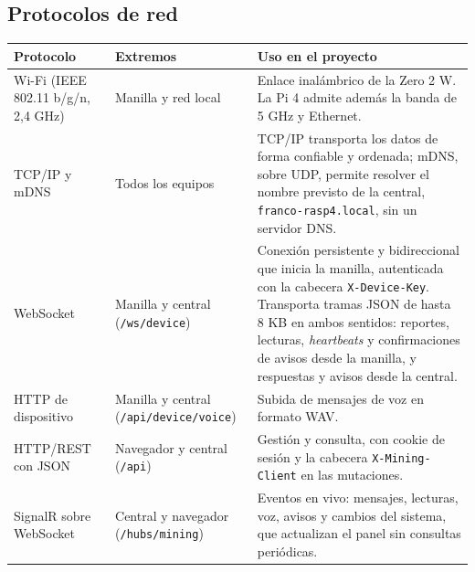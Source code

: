 \documentclass[10pt,a4paper]{article}
\newcommand{\code}[1]{{\small\urlstyle{tt}\nolinkurl{#1}}}
\begin{document}
\subsection{Protocolos de red}
\label{tab:red}
\begin{tabularx}{\linewidth}{@{}P{30mm}P{36mm}Y@{}}
\toprule\textbf{Protocolo} & \textbf{Extremos} & \textbf{Uso en el proyecto}\\\midrule
Wi-Fi (IEEE 802.11 b/g/n, 2,4 GHz) & Manilla y red local & Enlace inalámbrico de la Zero 2 W. La Pi 4 admite además la banda de 5 GHz y Ethernet.\\
TCP/IP y mDNS & Todos los equipos & TCP/IP transporta los datos de forma confiable y ordenada; mDNS, sobre UDP, permite resolver el nombre previsto de la central, \code{franco-rasp4.local}, sin un servidor DNS.\\
WebSocket~\cite{rfc6455} & Manilla y central (\code{/ws/device}) & Conexión persistente y bidireccional que inicia la manilla, autenticada con la cabecera \code{X-Device-Key}. Transporta tramas JSON de hasta 8 KB en ambos sentidos: reportes, lecturas, \emph{heartbeats} y confirmaciones de avisos desde la manilla, y respuestas y avisos desde la central.\\
HTTP de dispositivo & Manilla y central (\code{/api/device/voice}) & Subida de mensajes de voz en formato WAV.\\
HTTP/REST con JSON & Navegador y central (\code{/api}) & Gestión y consulta, con cookie de sesión y la cabecera \code{X-Mining-Client} en las mutaciones.\\
SignalR sobre WebSocket & Central y navegador (\code{/hubs/mining}) & Eventos en vivo: mensajes, lecturas, voz, avisos y cambios del sistema, que actualizan el panel sin consultas periódicas.\\\bottomrule
\end{tabularx}
\end{document}

